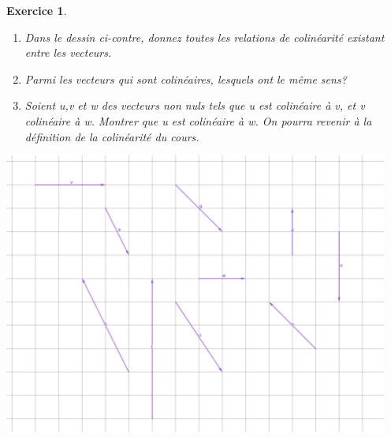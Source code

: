\documentclass[10pt,a4paper]{article}
\newtheorem{exo}{Exercice}
\begin{document}
\begin{minipage}{0.35\textwidth}
    \begin{exo}
        \begin{enumerate}
            \item         Dans le dessin ci-contre, donnez toutes les relations de colinéarité existant entre les vecteurs.
            \item Parmi les vecteurs qui sont colinéaires, lesquels ont le même sens?
            \item Soient u,v et w des vecteurs non nuls tels que u est colinéaire à v, et v colinéaire à w. Montrer que u est colinéaire à w. On pourra revenir à la définition de la colinéarité du cours.
        \end{enumerate}
    \end{exo}
\end{minipage}
\begin{minipage}{0.62\textwidth}
    \center
    \includegraphics[width=0.95\textwidth]{assets/ExoColineaires-Vecteurs.png}
\end{minipage}
\end{document}
